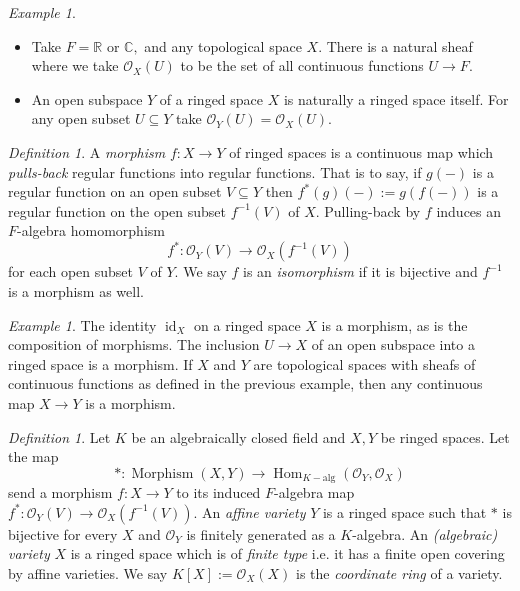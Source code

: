 \documentclass[BSc]{usydthesis}
\numberwithin{equation}{chapter}
\theoremstyle{remark}
\newtheorem{Definition}[equation]{Definition}
\newtheorem{Example}[equation]{Example}
\newcommand{\R}{\mathbb{R}}
\newcommand{\C}{\mathbb{C}}
\DeclareMathOperator{\Hom}{Hom}
\begin{document}
\begin{Example}
~
\begin{itemize}
 \item Take $F=\R$ or $\C,$ and any topological space $X.$ There is a natural sheaf where we take $\mathcal{O}_X(U)$ to be the set of all continuous functions $U\to F.$ 
 \item An open subspace $Y$ of a ringed space $X$ is naturally a ringed space itself. For any open subset $U\subseteq Y$ take $\mathcal{O}_Y(U) = \mathcal{O}_X(U).$
\end{itemize}
\end{Example}

\begin{Definition}
 A {\em morphism} $f:X\to Y$ of ringed spaces is a continuous map which {\em pulls-back} regular functions into regular functions. That is to say, if $g(-)$ is a regular function on an open subset $V\subseteq Y$ then $f^*(g)(-):= g(f(-))$ is a regular function on the open subset $f^{-1}(V)$ of $X.$ Pulling-back by $f$ induces an $F$-algebra homomorphism $$ f^*: \mathcal{O}_Y(V) \to \mathcal{O}_X( f^{-1}(V) )$$ for each open subset $V$ of $Y.$ We say $f$ is an {\em isomorphism} if it is bijective and $f^{-1}$ is a morphism as well. 
\end{Definition}

\begin{Example}
 The identity $\operatorname{id}_X$ on a ringed space $X$ is a morphism, as is the composition of morphisms. The inclusion $U\to X$ of an open subspace into a ringed space is a morphism. If $X$ and $Y$ are topological spaces with sheafs of continuous functions as defined in the previous example, then any continuous map $X\to Y$ is a morphism. 
\end{Example}

\begin{Definition} 
 Let $K$ be an algebraically closed field and $X,Y$ be ringed spaces. Let the map $$ *: \operatorname{Morphism}(X,Y) \to \Hom_{K-\text{alg}} ( \mathcal{O}_Y, \mathcal{O}_X )$$ send a morphism $f:X\to Y$ to its induced $F$-algebra map $ f^*: \mathcal{O}_Y(V) \to \mathcal{O}_X( f^{-1}(V) ).$ An {\em affine variety} $Y$ is a ringed space such that $*$ is bijective for every $X$ and $\mathcal{O}_Y$ is finitely generated as a $K$-algebra. An {\em (algebraic) variety} $X$ is a ringed space which is of {\em finite type} i.e. it has a finite open covering by affine varieties. We say $K[X]:= \mathcal{O}_X(X)$ is the {\em coordinate ring} of a variety. 
\end{Definition}
\end{document}
